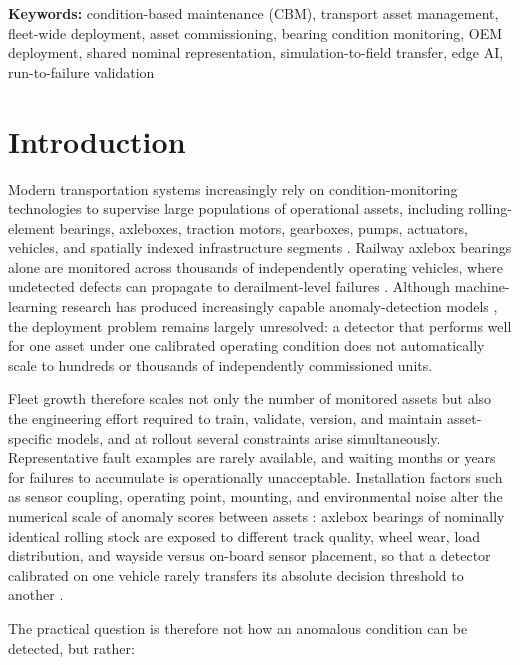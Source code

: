 \documentclass[numbered]{trbunofficial}
\begin{document}
\noindent\textbf{Keywords:}
condition-based maintenance (CBM),
transport asset management,
fleet-wide deployment,
asset commissioning,
bearing condition monitoring,
OEM deployment,
shared nominal representation,
simulation-to-field transfer,
edge AI,
run-to-failure validation


\section{Introduction}
\label{sec:introduction}

Modern transportation systems increasingly rely on condition-monitoring technologies to supervise
large populations of operational assets, including rolling-element bearings, axleboxes, traction
motors, gearboxes, pumps, actuators, vehicles, and spatially indexed infrastructure segments
\citep{jardine2006,zhao2019}. Railway axlebox bearings alone are monitored across thousands of
independently operating vehicles, where undetected defects can propagate to derailment-level
failures \citep{entezami2020}. Although machine-learning research has produced increasingly
capable anomaly-detection models \citep{chandola2009,zhao2019}, the deployment problem remains
largely unresolved: a detector that performs well for one asset under one calibrated operating
condition does not automatically scale to hundreds or thousands of independently commissioned
units.

Fleet growth therefore scales not only the number of monitored assets but also the engineering
effort required to train, validate, version, and maintain asset-specific models, and at rollout
several constraints arise simultaneously. Representative fault examples are rarely available, and
waiting months or years for failures to accumulate is operationally unacceptable. Installation
factors such as sensor coupling, operating point, mounting, and environmental noise alter the
numerical scale of anomaly scores between assets \citep{randall2011}: axlebox bearings of
nominally identical rolling stock are exposed to different track quality, wheel wear, load
distribution, and wayside versus on-board sensor placement, so that a detector calibrated on one
vehicle rarely transfers its absolute decision threshold to another \citep{entezami2020}.

The practical question is therefore not how an anomalous condition can be detected, but rather:
\end{document}

